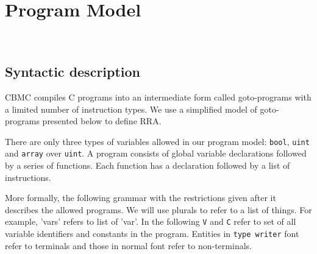 \section{Program Model}~\label{sec:model}

\newcommand{\ra}{\(\rightarrow\)}
\newcommand{\wh}{{\tt while }}
\newcommand{\dt}{{\tt do }}

\subsection{Syntactic description}

CBMC compiles C programs into an intermediate form called
goto-programs with a limited number of instruction types. We use a
simplified model of goto-programs presented below to define RRA.

There are only three types of variables allowed in our program model:
{\tt bool}, {\tt uint} and {\tt array} over {\tt uint}. A program \prog{}
consists of global variable declarations followed by a series of
functions. Each function has a declaration followed by a list of
instructions.

More formally, the following grammar with the restrictions given after
it describes the allowed programs. We will use plurals to refer to a
list of things. For example, 'vars' refers to list of 'var'. In the
following {\tt V} and {\tt C} refer to set of all variable identifiers
and constants in the program. Entities in {\tt type writer} font refer
to terminals and those in normal font refer to non-terminals.

